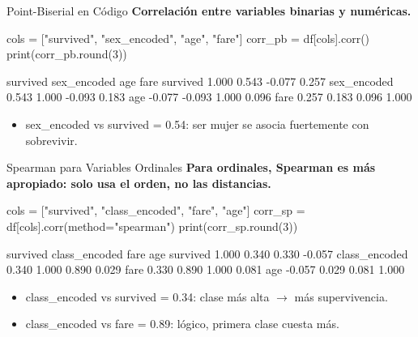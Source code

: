 \documentclass[aspectratio=169, 11pt]{beamer}
\begin{document}
\begin{frame}[fragile,shrink=28]{Point-Biserial en Código}
  \vspace{-6pt}
  {\footnotesize\color{arcaDark}\bfseries
    Correlación entre variables binarias y numéricas.}

  \vspace{4pt}
  \begin{pyblock}
cols = ["survived", "sex_encoded", "age", "fare"]
corr_pb = df[cols].corr()
print(corr_pb.round(3))
  \end{pyblock}

  \vspace{4pt}
  \begin{outputblock}
              survived  sex_encoded    age    fare
survived         1.000        0.543 -0.077   0.257
sex_encoded      0.543        1.000 -0.093   0.183
age             -0.077       -0.093  1.000   0.096
fare             0.257        0.183  0.096   1.000
  \end{outputblock}

  \vspace{4pt}
  {\scriptsize\color{textMuted}
  \begin{itemize}\setlength{\itemsep}{3pt}
    \item[{\color{arcaRed}\scriptsize\faArrowRight}]
      sex\_encoded vs survived = 0.54: ser mujer se asocia fuertemente con sobrevivir.
  \end{itemize}
  }
\end{frame}

\begin{frame}[fragile,shrink=28]{Spearman para Variables Ordinales}
  \vspace{-6pt}
  {\footnotesize\color{arcaDark}\bfseries
    Para ordinales, Spearman es más apropiado: solo usa el orden, no las distancias.}

  \vspace{4pt}
  \begin{pyblock}
cols = ["survived", "class_encoded", "fare", "age"]
corr_sp = df[cols].corr(method="spearman")
print(corr_sp.round(3))
  \end{pyblock}

  \vspace{4pt}
  \begin{outputblock}
                survived  class_encoded    fare    age
survived           1.000         0.340   0.330 -0.057
class_encoded      0.340         1.000   0.890  0.029
fare               0.330         0.890   1.000  0.081
age               -0.057         0.029   0.081  1.000
  \end{outputblock}

  \vspace{4pt}
  {\scriptsize\color{textMuted}
  \begin{itemize}\setlength{\itemsep}{3pt}
    \item[{\color{arcaRed}\scriptsize\faArrowRight}]
      class\_encoded vs survived = 0.34: clase más alta $\to$ más supervivencia.
    \item[{\color{arcaRed}\scriptsize\faArrowRight}]
      class\_encoded vs fare = 0.89: lógico, primera clase cuesta más.
  \end{itemize}
  }
\end{frame}
\end{document}
